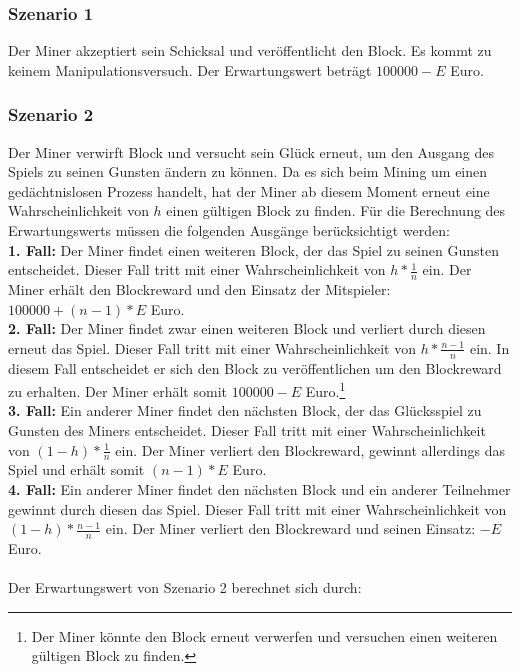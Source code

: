 \subsubsection{Szenario 1} 
Der Miner akzeptiert sein Schicksal und veröffentlicht den Block. Es kommt zu keinem Manipulationsversuch. Der Erwartungswert beträgt $100000 - E$ Euro.
\subsubsection{Szenario 2} 
Der Miner verwirft Block und versucht sein Glück erneut, um den Ausgang des Spiels zu seinen Gunsten ändern zu können. Da es sich beim Mining um einen gedächtnislosen Prozess handelt, hat der Miner ab diesem Moment erneut eine Wahrscheinlichkeit von $h$ einen gültigen Block zu finden. Für die Berechnung des Erwartungswerts müssen die folgenden Ausgänge berücksichtigt werden:\\
\textbf{1. Fall:} Der Miner findet einen weiteren Block, der das Spiel zu seinen Gunsten entscheidet. Dieser Fall tritt mit einer Wahrscheinlichkeit von $h*\frac{1}{n}$ ein. Der Miner erhält den Blockreward und den Einsatz der Mitspieler: $100000 + (n-1)*E$ Euro.\\
\textbf{2. Fall:} Der Miner findet zwar einen weiteren Block und verliert durch diesen erneut das Spiel. Dieser Fall tritt mit einer Wahrscheinlichkeit von $h*\frac{n-1}{n}$ ein. In diesem Fall entscheidet er sich den Block zu veröffentlichen um den Blockreward zu erhalten. Der Miner erhält somit $100000 - E$ Euro.\footnote{Der Miner könnte den Block erneut verwerfen und versuchen einen weiteren gültigen Block zu finden.}\\
\textbf{3. Fall:} Ein anderer Miner findet den nächsten Block, der das Glücksspiel zu Gunsten des Miners entscheidet. Dieser Fall tritt mit einer Wahrscheinlichkeit von $(1-h)*\frac{1}{n}$ ein. Der Miner verliert den Blockreward, gewinnt allerdings das Spiel und erhält somit $(n-1)*E$ Euro.\\
\textbf{4. Fall:} Ein anderer Miner findet den nächsten Block und ein anderer Teilnehmer gewinnt durch diesen das Spiel. Dieser Fall tritt mit einer Wahrscheinlichkeit von $(1-h)*\frac{n-1}{n}$ ein. Der Miner verliert den Blockreward und seinen Einsatz: $-E$ Euro.\\\\
Der Erwartungswert von Szenario 2 berechnet sich durch:\\
